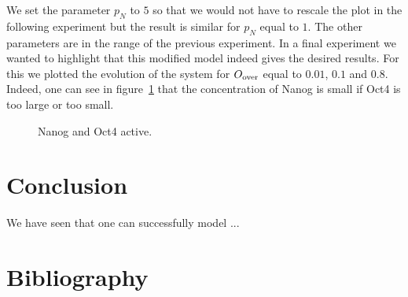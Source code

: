 We set the parameter $p_N$ to $5$ so that we would not have to rescale the plot in the following experiment but the result is 
similar for $p_N$ equal to $1$. The other parameters
are in the range of the previous experiment.
In a final experiment we wanted to highlight that this modified model indeed gives the 
desired results.
For this we plotted the evolution of the system for $O_\text{over}$ equal to $0.01$, $0.1$ and $0.8$.
Indeed, one can see in figure~\ref{pl:repressed} that the concentration of Nanog is small if 
Oct4 is too large or too small.

\begin{figure}
\centering
\begin{minipage}[t]{0.3\textwidth}
\centering
\graphicspath{{../Plots/}}

\end{minipage}
\hfill
\centering
\begin{minipage}[t]{0.3\textwidth}
\centering
\graphicspath{{../Plots/}}

\end{minipage}
\hspace*{0.2cm}
\begin{minipage}[t]{0.3\textwidth}
\centering
\graphicspath{{../Plots/}}

\end{minipage}
\caption{Nanog and Oct4 active.}
\label{pl:repressed}
\end{figure}

\section{Conclusion}
We have seen that one can successfully model ...

\newpage
\section*{Bibliography}
\nocite{*}
\printbibliography[heading=none, keyword={secondary}]



